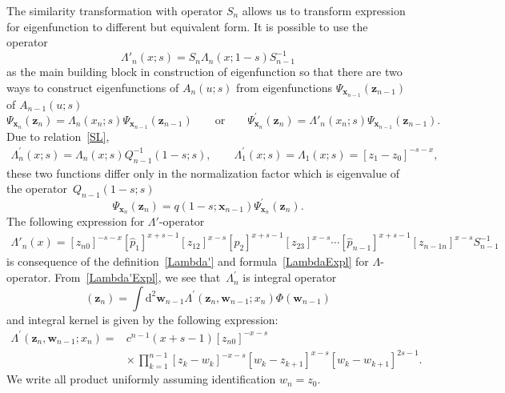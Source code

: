 \documentclass[pdftex]{sigma}
\numberwithin{equation}{section}
\begin{document}
The similarity transformation with operator $S_n$ allows us to
transform expression for eigenfunction to different but equivalent form.
It is possible to use the operator
\begin{equation} \label{Lambda'}
\Lambda'_n(x;s) = S_n \Lambda_n(x;1-s) S_{n-1}^{-1}
\end{equation}
as the main building block in construction of eigenfunction so that
there are two ways to construct eigenfunctions of $A_{n}(u;s)$ from eigenfunctions $\Psi_{\bm {x}_{n-1}}(\bm z_{n-1})$ of $A_{n-1}(u;s)$
\begin{equation} \label{PsiPsi'}
\Psi_{\bm {x}_{n}}(\bm z_{n}) = \Lambda_n(x_n;s)
\Psi_{\bm {x}_{n-1}}(\bm z_{n-1})
	\qquad \text{or} \qquad
\Psi^{\prime}_{\bm {x}_{n}}(\bm z_{n}) = \Lambda'_n(x_n;s)
\Psi_{\bm {x}_{n-1}}(\bm z_{n-1}) .
\end{equation}
Due to relation~\eqref{SL},
\begin{align*}
\Lambda^{\prime}_n(x;s) =
\Lambda_n(x;s) Q^{-1}_{n-1}(1-s;s), \qquad
\Lambda^{\prime}_1(x;s) =
\Lambda_1(x;s) = [z_1-z_0]^{-s-x} ,
\end{align*}
these two functions differ only in the normalization factor
which is eigenvalue of the operator~$Q_{n-1}(1-s;s)$
\begin{equation*}
\Psi_{\bm {x}_{n}}(\bm z_{n})
= q(1-s;\bm x_{n-1}) \Psi^{\prime}_{\bm {x}_{n}}(\bm z_{n}) .
\end{equation*}
The following expression for $\Lambda'$-operator
\begin{align} \label{Lambda'Expl}
	\Lambda'_n( x)
	= [z_{n0}]^{-s-x}
	[\hat{p}_1]^{x+s-1} [z_{12}]^{x-s}
	[\hat{p}_2]^{x+s-1} [z_{23}]^{x-s}\cdots
	[\hat{p}_{n-1}]^{x+s-1} [z_{n-1 n}]^{x-s}
	S_{n-1}^{-1}
\end{align}
is consequence of the definition~\eqref{Lambda'} and
formula~\eqref{LambdaExpl} for $\Lambda$-operator.
From~\eqref{Lambda'Expl}, we see that~$\Lambda^{\prime}_n$ is integral operator
\begin{equation*}
[\Lambda^{\prime}_n(x) \Phi](\bm z_n) =
\int \mathrm{d}^{2} \bm w_{n-1}
\Lambda^{\prime}(\bm z_n,\bm w_{n-1};x_n)
\Phi(\bm w_{n-1})
\end{equation*}
and integral kernel is given by the following expression:
\begin{align*}
\Lambda^{\prime}(\bm z_n,\bm w_{n-1}; x_n) ={}& c^{n-1}(x+s-1) [z_{n 0}]^{-x-s} \\
& {\times}\,
\prod\limits_{k=1}^{n-1} [z_k-w_k]^{-x-s} [w_k-z_{k+1}]^{x-s}
[w_k-w_{k+1}]^{2s-1} .
\end{align*}
We write all product uniformly assuming identification $w_{n} = z_0$.
\end{document}
